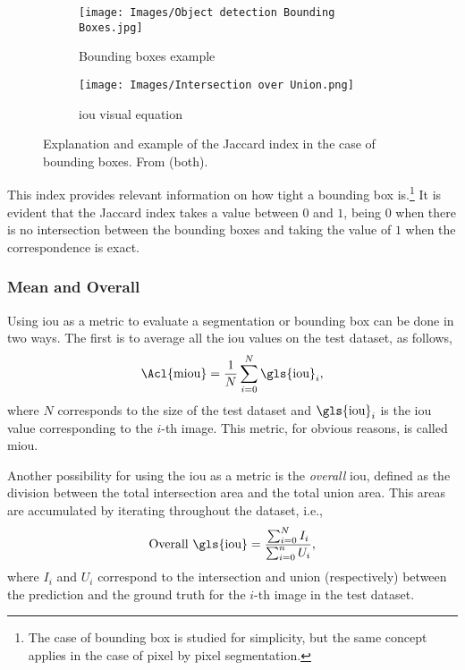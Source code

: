 \begin{figure}[ht]
  \begin{subfigure}[t]{.45\textwidth}
    \centering
    \caption[Bounding boxes example]{Bounding boxes
      example}
    \texttt{[image: Images/Object detection Bounding Boxes.jpg]}
  \end{subfigure}\hfill
  \begin{subfigure}[t]{.45\textwidth}
    \centering
    \caption{\gls{iou} visual equation}
    \texttt{[image: Images/Intersection over Union.png]}
  \end{subfigure}
  \caption[Jaccard index explanation]{Explanation and example of the Jaccard
    index in the case of bounding boxes. From
     (both).}
\end{figure}

This index provides relevant information on how tight a bounding
box is.\footnote{The case of bounding box is studied for
  simplicity, but the same concept applies in the case of pixel by pixel
  segmentation.} It is evident that the Jaccard index
takes a value between \(0\) and \(1\), being \(0\) when there is no
intersection between the bounding boxes and taking the
value of \(1\) when the correspondence is exact.

\subsubsection{Mean and Overall }

Using \gls{iou} as a metric to evaluate a segmentation or bounding
box can be done in two ways. The first is to average all
the \gls{iou} values on the test dataset, as follows,
\begin{equation}
  \text{\Acl{miou}} = \frac{1}{N}\sum_{i=0}^N \text{\gls{iou}}_i,
\end{equation}
where \(N\) corresponds to the size of the test dataset and
\(\text{\gls{iou}}_i\) is the \gls{iou} value corresponding to the \(i\)-th
image. This metric, for obvious reasons, is called \gls{miou}.

Another possibility for using the \gls{iou} as a metric is the \emph{overall}
\gls{iou}, defined as the division between the total intersection area and the
total union area. This areas are accumulated by iterating throughout the
dataset, i.e.,
\begin{equation}
  \text{Overall \gls{iou}} =
  \frac{\sum_{i=0}^N I_i}{\sum_{i=0}^n U_i},
\end{equation}
where \(I_i\) and \(U_i\) correspond to the intersection and union
(respectively) between the prediction and the ground truth for the \(i\)-th
image in the test dataset.

